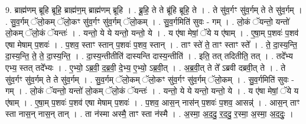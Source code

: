 \documentclass[17pt]{extarticle}
\begin{document}
9. ब्राह्म॑णम् ब्रूहि ब्रूहि॒ ब्राह्म॑ण॒म् ब्राह्म॑णम् ब्रूहि । . ब्रू॒हि॒ ते ते ब्रू॑हि ब्रूहि॒ ते । . ते सु॑व॒र्गꣳ सु॑व॒र्गम् ते ते सु॑व॒र्गम् । . सु॒व॒र्गम् ॅलो॒कम् ॅलो॒कꣳ सु॑व॒र्गꣳ सु॑व॒र्गम् ॅलो॒कम् । . सु॒व॒र्गमिति॑ सुवः - गम् । . लो॒कं ॅयन्तो॒ यन्तो॑ लो॒कम् ॅलो॒कं ॅयन्तः॑ । . यन्तो॒ ये ये यन्तो॒ यन्तो॒ ये । . य ए॑षा मेषां॒ ॅये य ए॑षाम् । . ए॒षा॒म् प॒शवः॑ प॒शव॑ एषा मेषाम् प॒शवः॑ । . प॒शव॒ स्ताꣳ स्तान् प॒शवः॑ प॒शव॒ स्तान् । . ताꣳ स्ते॑ ते॒ ताꣳ स्ताꣳ स्ते᳚ । . ते॒ दा॒स्य॒न्ति॒ दा॒स्य॒न्ति॒ ते॒ ते॒ दा॒स्य॒न्ति॒ । . दा॒स्य॒न्तीतीति॑ दास्यन्ति दास्य॒न्तीति॑ । . इति॒ तत् तदितीति॒ तत् । . तदे᳚भ्य एभ्य॒ स्तत् तदे᳚भ्यः । . ए॒भ्यो॒ ऽब्र॒वी॒ द॒ब्र॒वी॒ दे॒भ्य॒ ए॒भ्यो॒ ऽब्र॒वी॒त् । . अ॒ब्र॒वी॒त् ते ते᳚ ऽब्रवी दब्रवी॒त् ते । . ते सु॑व॒र्गꣳ सु॑व॒र्गम् ते ते सु॑व॒र्गम् । . सु॒व॒र्गम् ॅलो॒कम् ॅलो॒कꣳ सु॑व॒र्गꣳ सु॑व॒र्गम् ॅलो॒कम् । . सु॒व॒र्गमिति॑ सुवः - गम् । . लो॒कं ॅयन्तो॒ यन्तो॑ लो॒कम् ॅलो॒कं ॅयन्तः॑ । . यन्तो॒ ये ये यन्तो॒ यन्तो॒ ये । . य ए॑षा मेषां॒ ॅये य ए॑षाम् । . ए॒षा॒म् प॒शवः॑ प॒शव॑ एषा मेषाम् प॒शवः॑ । . प॒शव॒ आस॒न् नास॑न् प॒शवः॑ प॒शव॒ आसन्न्॑ । . आस॒न् ताꣳ स्ता नास॒न् नास॒न् तान् । . ता न॑स्मा अस्मै॒ ताꣳ स्ता न॑स्मै । . अ॒स्मा॒ अ॒द॒दु॒ र॒द॒दु॒ र॒स्मा॒ अ॒स्मा॒ अ॒द॒दुः॒ । \newline
\end{document}
